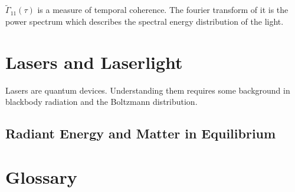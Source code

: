 \documentclass[12pt]{report}
\begin{document}
$\tilde{\Gamma}_{11}(\tau)$ is a measure of temporal coherence. The fourier transform of it is the power spectrum which describes the spectral energy distribution of the light. 

\section{Lasers and Laserlight}
Lasers are quantum devices. Understanding them requires some background in blackbody radiation and the Boltzmann distribution. 

\subsection{Radiant Energy and Matter in Equilibrium}


\section{Glossary}
\end{document}
